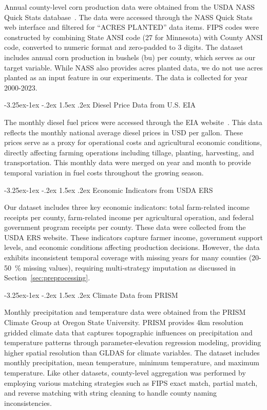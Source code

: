 \documentclass[10pt,twocolumn]{article}
\makeatletter
\newcommand{\refsec}[1]{Section~\ref{#1}}
\renewcommand\subsection{\@startsection{subsection}{2}{\z@}%
  {-3.25ex\@plus -1ex \@minus -.2ex}%
  {1.5ex \@plus .2ex}%
  {\normalfont\normalsize\bfseries}}
\makeatother
\begin{document}
Annual county-level corn production data were obtained from the USDA NASS Quick Stats database~\cite{usda_nass}.
The data were accessed through the NASS Quick Stats web interface and filtered for ``ACRES PLANTED'' data items.
FIPS codes were constructed by combining State ANSI code (27 for Minnesota) with County ANSI code, converted to numeric format and zero-padded to 3 digits.
The dataset includes annual corn production in bushels (bu) per county, which serves as our target variable.
While NASS also provides acres planted data, we do not use acres planted as an input feature in our experiments.
The data is collected for year 2000-2023.

\subsection{Diesel Price Data from U.S. EIA}

The monthly diesel fuel prices were accessed through the EIA website~\cite{eia}.
This data reflects the monthly national average diesel prices in USD per gallon.
These prices serve as a proxy for operational costs and agricultural economic conditions, directly affecting farming operations including tillage, planting, harvesting, and transportation.
This monthly data were merged on year and month to provide temporal variation in fuel costs throughout the growing season.

\subsection{Economic Indicators from USDA ERS}

Our dataset includes three key economic indicators: total farm-related income receipts per county, farm-related income per agricultural operation, and federal government program receipts per county.
These data were collected from the USDA ERS website.
These indicators capture farmer income, government support levels, and economic conditions affecting production decisions.
However, the data exhibits inconsistent temporal coverage with missing years for many counties (\num{20}-\SI{50}{\percent} missing values), requiring multi-strategy imputation as discussed in \refsec{sec:preprocessing}.

\subsection{Climate Data from PRISM}

Monthly precipitation and temperature data were obtained from the PRISM Climate Group at Oregon State University.
PRISM provides 4km resolution gridded climate data that captures topographic influences on precipitation and temperature patterns through parameter-elevation regression modeling, providing higher spatial resolution than GLDAS for climate variables.
The dataset includes monthly precipitation, mean temperature, minimum temperature, and maximum temperature.
Like other datasets, county-level aggregation was performed by employing various matching strategies such as FIPS exact match, partial match, and reverse matching with string cleaning to handle county naming inconsistencies.
\end{document}
